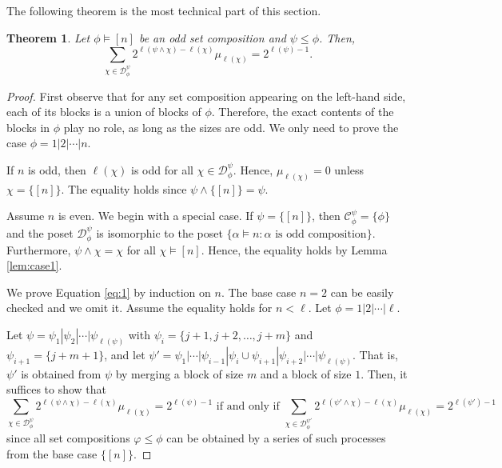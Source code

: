 \documentclass[11pt]{amsart}
\newtheorem{Theorem}{Theorem}[section]
\numberwithin{equation}{section}
\begin{document}
The following theorem is the most technical part of this section.

\begin{Theorem}\label{lem:main}
	Let $\phi\vDash[n]$ be an odd set composition and $\psi\leq\phi$. Then,
	\begin{equation}\label{eq:1}
		\sum_{\chi\in\mathscr{D}_\phi^\psi}2^{\ell(\psi\land\chi)-\ell(\chi)}\mu_{\ell(\chi)}=2^{\ell(\psi)-1}.
	\end{equation}
\end{Theorem}

\begin{proof}
	First observe that for any set composition appearing on the left-hand side, each of its blocks is a union of blocks of $\phi$. Therefore, the exact contents of the blocks in $\phi$ play no role, as long as the sizes are odd. We only need to prove the case  $\phi=1|2|\cdots|n$.
	
	If $n$ is odd, then $\ell(\chi)$ is odd for all $\chi\in\mathscr{D}_\phi^\psi$. Hence, $\mu_{\ell(\chi)}=0$ unless $\chi=\{[n]\}$. The equality holds since $\psi\land\{[n]\}=\psi$.
	
	Assume $n$ is even. We begin with a special case. If $\psi=\{[n]\}$, then $\mathscr{C}_\phi^\psi=\{\phi\}$ and the poset $\mathscr{D}_\phi^\psi$ is isomorphic to the poset $\{\alpha\vDash n:\alpha\text{ is odd composition}\}$. Furthermore, $\psi\land\chi=\chi$ for all $\chi\vDash[n]$. Hence, the equality holds by Lemma \ref{lem:case1}.

	We prove Equation \ref{eq:1} by induction on $n$. The base case $n=2$ can be easily checked and we omit it. Assume the equality holds for $n<\ell$. Let $\phi=1|2|\cdots|\ell$. 
	
	Let $\psi=\psi_1|\psi_2|\cdots|\psi_{\ell(\psi)}$ with $\psi_i=\{j+1,j+2,\dots,j+m\}$ and $\psi_{i+1}=\{j+m+1\}$, and let $\psi'=\psi_1|\cdots|\psi_{i-1}|\psi_i\cup \psi_{i+1}|\psi_{i+2}|\cdots|\psi_{\ell(\psi)}$. That is, $\psi'$ is obtained from $\psi$ by merging a block of size $m$ and a block of size $1$. Then, it suffices to show that $$\displaystyle\sum_{{\chi\in\mathscr{D}_\phi^\psi}}2^{\ell(\psi\land\chi)-\ell(\chi)}\mu_{\ell(\chi)}=2^{\ell(\psi)-1} \text{~if and only if~} \displaystyle\sum_{{\chi\in\mathscr{D}_\phi^{\psi'}}}2^{\ell(\psi'\land\chi)-\ell(\chi)}\mu_{\ell(\chi)}=2^{\ell(\psi')-1}$$ since all set compositions $\varphi\leq\phi$ can be obtained by a series of such processes from the base case $\{[n]\}$.
	

\end{proof}
\end{document}
